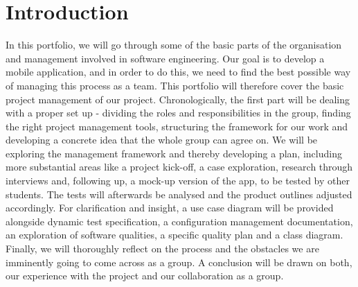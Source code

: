 

\section{Introduction}
In this portfolio, we will go through some of the basic parts of the organisation and management involved in software engineering.
Our goal is to develop a mobile application, and in order to do this, we need to find the best possible way of managing this process as a team.
This portfolio will therefore cover the basic project management of our project.
Chronologically, the first part will be dealing with a proper set up - dividing the roles and responsibilities in the group,
finding the right project management tools, structuring the framework for our work and developing a concrete idea that the whole group can agree on.
We will be exploring the management framework and thereby developing a plan, including more substantial areas like a project kick-off, a case exploration,
research through interviews and, following up, a mock-up version of the app, to be tested by other students.
The tests will afterwards be analysed and the product outlines adjusted accordingly. For clarification and insight, a use case diagram will be provided alongside
dynamic test specification, a configuration management documentation, an exploration of software qualities, a specific quality plan and a class diagram.
Finally, we will thoroughly reflect on the process and the obstacles we are imminently going to come across as a group.
A conclusion will be drawn on both, our experience with the project and our collaboration as a group.
